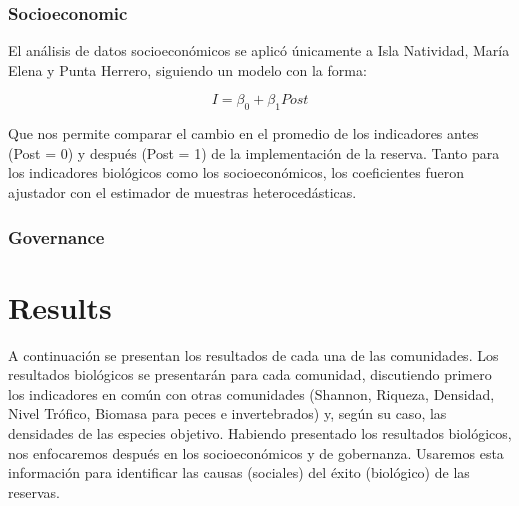 \documentclass{frontiersSCNS}
\begin{document}
\subsubsection{Socioeconomic}\label{socioeconomic}

El análisis de datos socioeconómicos se aplicó únicamente a Isla
Natividad, María Elena y Punta Herrero, siguiendo un modelo con la
forma:

\[I = \beta_0 + \beta_1Post\]

Que nos permite comparar el cambio en el promedio de los indicadores
antes (Post = 0) y después (Post = 1) de la implementación de la
reserva. Tanto para los indicadores biológicos como los socioeconómicos,
los coeficientes fueron ajustador con el estimador de muestras
heterocedásticas.

\subsubsection{Governance}\label{governance}

\section{Results}\label{results}

A continuación se presentan los resultados de cada una de las
comunidades. Los resultados biológicos se presentarán para cada
comunidad, discutiendo primero los indicadores en común con otras
comunidades (Shannon, Riqueza, Densidad, Nivel Trófico, Biomasa para
peces e invertebrados) y, según su caso, las densidades de las especies
objetivo. Habiendo presentado los resultados biológicos, nos enfocaremos
después en los socioeconómicos y de gobernanza. Usaremos esta
información para identificar las causas (sociales) del éxito (biológico)
de las reservas.
\end{document}
